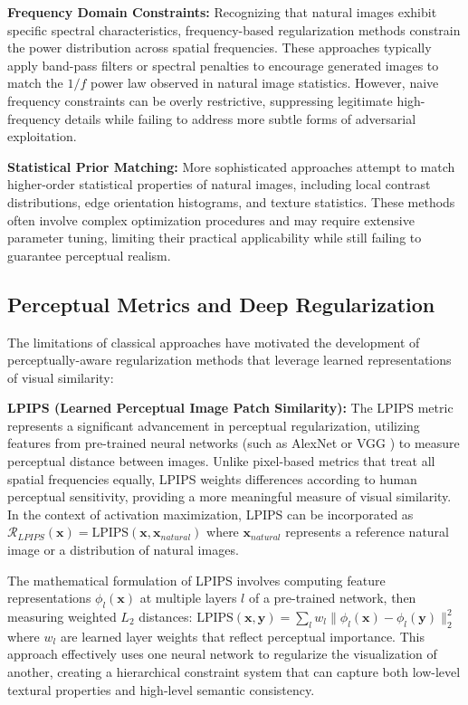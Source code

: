 \documentclass[licencjacka,en]{pracamgr}
\begin{document}
\textbf{Frequency Domain Constraints:} Recognizing that natural images exhibit specific spectral characteristics, frequency-based regularization methods constrain the power distribution across spatial frequencies. These approaches typically apply band-pass filters or spectral penalties to encourage generated images to match the $1/f$ power law observed in natural image statistics. However, naive frequency constraints can be overly restrictive, suppressing legitimate high-frequency details while failing to address more subtle forms of adversarial exploitation.

\textbf{Statistical Prior Matching:} More sophisticated approaches attempt to match higher-order statistical properties of natural images, including local contrast distributions, edge orientation histograms, and texture statistics. These methods often involve complex optimization procedures and may require extensive parameter tuning, limiting their practical applicability while still failing to guarantee perceptual realism.

\subsection{Perceptual Metrics and Deep Regularization}

The limitations of classical approaches have motivated the development of perceptually-aware regularization methods that leverage learned representations of visual similarity:

\textbf{LPIPS (Learned Perceptual Image Patch Similarity):} The LPIPS metric \citep{zhang2018perceptual} represents a significant advancement in perceptual regularization, utilizing features from pre-trained neural networks (such as AlexNet or VGG \citep{krizhevsky2012imagenet,simonyan2014very}) to measure perceptual distance between images. Unlike pixel-based metrics that treat all spatial frequencies equally, LPIPS weights differences according to human perceptual sensitivity, providing a more meaningful measure of visual similarity. In the context of activation maximization, LPIPS can be incorporated as $\mathcal{R}_{LPIPS}(\mathbf{x}) = \text{LPIPS}(\mathbf{x}, \mathbf{x}_{natural})$ where $\mathbf{x}_{natural}$ represents a reference natural image or a distribution of natural images.

The mathematical formulation of LPIPS involves computing feature representations $\phi_l(\mathbf{x})$ at multiple layers $l$ of a pre-trained network, then measuring weighted $L_2$ distances: $\text{LPIPS}(\mathbf{x}, \mathbf{y}) = \sum_l w_l \|\phi_l(\mathbf{x}) - \phi_l(\mathbf{y})\|_2^2$ where $w_l$ are learned layer weights that reflect perceptual importance. This approach effectively uses one neural network to regularize the visualization of another, creating a hierarchical constraint system that can capture both low-level textural properties and high-level semantic consistency.
\end{document}
